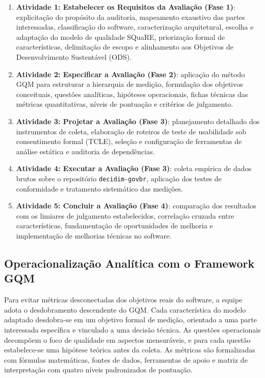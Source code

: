 \documentclass[journal]{IEEEtran}
\begin{document}
\begin{enumerate}
    \item \textbf{Atividade 1: Estabelecer os Requisitos da Avaliação (Fase 1)}: explicitação do propósito da auditoria, mapeamento exaustivo das partes interessadas, classificação do software, caracterização arquitetural, escolha e adaptação do modelo de qualidade SQuaRE, priorização formal de características, delimitação de escopo e alinhamento aos Objetivos de Desenvolvimento Sustentável (ODS).
    \item \textbf{Atividade 2: Especificar a Avaliação (Fase 2)}: aplicação do método GQM para estruturar a hierarquia de medição, formulação dos objetivos conceituais, questões analíticas, hipóteses operacionais, fichas técnicas das métricas quantitativas, níveis de pontuação e critérios de julgamento.
    \item \textbf{Atividade 3: Projetar a Avaliação (Fase 3)}: planejamento detalhado dos instrumentos de coleta, elaboração de roteiros de teste de usabilidade sob consentimento formal (TCLE), seleção e configuração de ferramentas de análise estática e auditoria de dependências.
    \item \textbf{Atividade 4: Executar a Avaliação (Fase 3)}: coleta empírica de dados brutos sobre o repositório \texttt{decidim-govbr}, aplicação dos testes de conformidade e tratamento sistemático das medições.
    \item \textbf{Atividade 5: Concluir a Avaliação (Fase 4)}: comparação dos resultados com os limiares de julgamento estabelecidos, correlação cruzada entre características, fundamentação de oportunidades de melhoria e implementação de melhorias técnicas no software.
\end{enumerate}

\subsection{Operacionalização Analítica com o Framework GQM}
\label{sec:metodo_gqm}

Para evitar métricas desconectadas dos objetivos reais do software, a equipe adota o desdobramento descendente do GQM. Cada característica do modelo adaptado desdobra-se em um objetivo formal de medição, orientado a uma parte interessada específica e vinculado a uma decisão técnica. As questões operacionais decompõem o foco de qualidade em aspectos mensuráveis, e para cada questão estabelece-se uma hipótese teórica antes da coleta. As métricas são formalizadas com fórmulas matemáticas, fontes de dados, ferramentas de apoio e matriz de interpretação com quatro níveis padronizados de pontuação.
\end{document}

